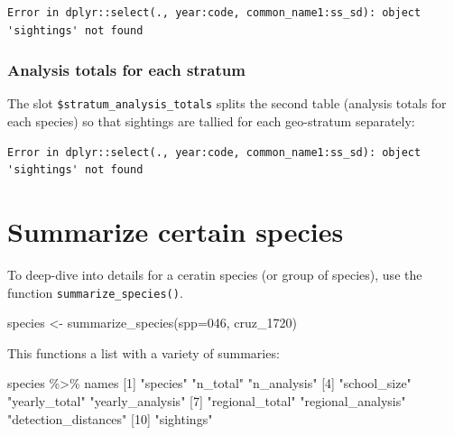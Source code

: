 \documentclass[
]{book}
\newenvironment{Shaded}{\begin{snugshade}}{\end{snugshade}}
\newcommand{\AttributeTok}[1]{\textcolor[rgb]{0.77,0.63,0.00}{#1}}
\newcommand{\DecValTok}[1]{\textcolor[rgb]{0.00,0.00,0.81}{#1}}
\newcommand{\FunctionTok}[1]{\textcolor[rgb]{0.00,0.00,0.00}{#1}}
\newcommand{\NormalTok}[1]{#1}
\newcommand{\OtherTok}[1]{\textcolor[rgb]{0.56,0.35,0.01}{#1}}
\newcommand{\SpecialCharTok}[1]{\textcolor[rgb]{0.00,0.00,0.00}{#1}}
\newcommand{\StringTok}[1]{\textcolor[rgb]{0.31,0.60,0.02}{#1}}
\begin{document}
\begin{verbatim}
Error in dplyr::select(., year:code, common_name1:ss_sd): object 'sightings' not found
\end{verbatim}

\hypertarget{analysis-totals-for-each-stratum}{%
\subsubsection*{Analysis totals for each stratum}\label{analysis-totals-for-each-stratum}}

The slot \texttt{\$stratum\_analysis\_totals} splits the second table (analysis totals for each species) so that sightings are tallied for each geo-stratum separately:

\begin{verbatim}
Error in dplyr::select(., year:code, common_name1:ss_sd): object 'sightings' not found
\end{verbatim}

\hypertarget{summarize-certain-species}{%
\section*{Summarize certain species}\label{summarize-certain-species}}

To deep-dive into details for a ceratin species (or group of species), use the function \texttt{summarize\_species()}.

\begin{Shaded}
\begin{Highlighting}[]
\NormalTok{species }\OtherTok{\textless{}{-}} \FunctionTok{summarize\_species}\NormalTok{(}\AttributeTok{spp=}\StringTok{\textquotesingle{}046\textquotesingle{}}\NormalTok{, cruz\_1720)}
\end{Highlighting}
\end{Shaded}

This functions a list with a variety of summaries:

\begin{Shaded}
\begin{Highlighting}[]
\NormalTok{species }\SpecialCharTok{\%\textgreater{}\%}\NormalTok{ names}
\NormalTok{ [}\DecValTok{1}\NormalTok{] }\StringTok{"species"}             \StringTok{"n\_total"}             \StringTok{"n\_analysis"}         
\NormalTok{ [}\DecValTok{4}\NormalTok{] }\StringTok{"school\_size"}         \StringTok{"yearly\_total"}        \StringTok{"yearly\_analysis"}    
\NormalTok{ [}\DecValTok{7}\NormalTok{] }\StringTok{"regional\_total"}      \StringTok{"regional\_analysis"}   \StringTok{"detection\_distances"}
\NormalTok{[}\DecValTok{10}\NormalTok{] }\StringTok{"sightings"}          
\end{Highlighting}
\end{Shaded}
\end{document}
